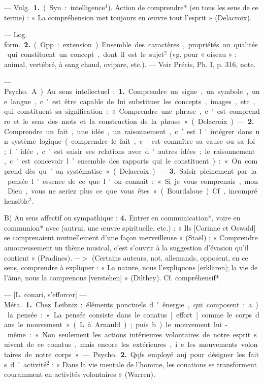 \begin{itemize}[leftmargin=1cm, label=, itemsep=11pt]
 — \si{Vulg.} {\bf 1.} (Syn. :
intelligence$^4$). Action de comprendre*
(en tous les sens de ce terme) : « La
compréhension met toujours en
œuvre tout l'esprit » (Delacroix).

— \si{Log. form.}  {\bf 2.} (Opp. : extension). Ensemble des caractères, propriétés ou qualités qui constituent
un concept, dont il est le sujet$^2$
(vg. pour « oiseau » : animal, vertébré, à sang chaud, ovipare, etc.).
— Voir Précis, Ph. I, p. 316, note.

 — \si{Psycho.} A) Au sens
intellectuel : {\bf 1.} Comprendre un
signe, un symbole, une langue, c'est
être capable de lui substituer les
concepts, images, etc., qui constituent sa signification : « Comprendre
une phrase, c’est comprendre et le
sens des mots et la construction de
la phrase » (Delacroix). —  {\bf 2.} Comprendre
un fait, une idée, un raisonnement, c’est l'intégrer dans un système logique (comprendre le fait,
c'est connaître sa cause ou sa loi;
l’idée, c’est saisir ses relations avec
d’autres idées; le raisonnement,
c'est concevoir l’ensemble des rapports qui le constituent) : « On comprend dès qu’on systématise » (Delacroix). —  {\bf 3.} Saisir pleinement par
la pensée l'essence de ce que l'on
connaît : « Si je vous comprenais,
mon Dieu, vous ne seriez plus ce que
vous êtes » (Bourdaloue). Cf, incompréhensible$^2$.

B) Au sens affectif ou sympathique :  {\bf 4.} Entrer en communication*, voire en communion* avec
(autrui, une œuvre spirituelle, etc.) :
« Ils [Corinne et Oswald] se comprenaient mutuellement d’une façon
merveilleuse » (Staël) ; « Comprendre
amoureusement un thème musical,
c'est s'ouvrir à la suggestion d'évasion qu'il contient » (Pradines).
$->$ (Certains auteurs, not. allemands, opposent, en ce sens, comprendre à expliquer : « La nature,
nous l'expliquons [erklären]; la vie
de l'âme, nous la comprenons [verstehen] » (Dilthey). Cf. compréhensif*.

 — [L. conari, s’efforcer] — \si{Méta.} {\bf 1.} Chez Leibniz : éléments ponctuels d'énergie, qui composent : a) la pensée : « La pensée
consiste dans le conatus [effort]
comme le corps dans le mouvement » (L. à Arnauld); puis b) le
mouvement lui-même : « Non seulement les actions intérieures volontaires de notre esprit suivent de ce
conatus, mais encore les extérieures,
i. e. les mouvements volontaires de
notre corps ». — \si{Psycho.} {\bf 2.} Qqfs.
employé auj. pour désigner les faits
d'activité$^2$ : « Dans la vie mentale de
l'homme, les conations se transforment
couramment en activités volontaires » (Warren).


\end{itemize}
